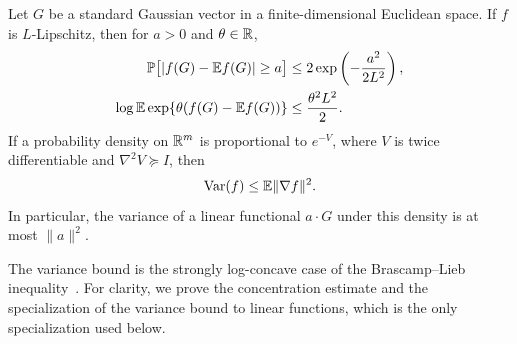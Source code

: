 \begin{lemma}\label{static-lem:gaussian-tools}
Let $G$ be a standard Gaussian vector in a finite-dimensional Euclidean space.
If $f$ is $L$-Lipschitz, then for $a>0$ and $\theta\in\mathbb R$,
\begin{align}
 \mathbb P\bigl[|f(G)-\mathbb E f(G)|\ge a\bigr]
 &\le 2\exp\left(-\frac{a^2}{2L^2}\right),
 \label{static-eq:gaussian-concentration}\\
 \log\mathbb E\exp\{\theta(f(G)-\mathbb E f(G))\}
 &\le\frac{\theta^2L^2}{2}.
 \label{static-eq:gaussian-mgf}
\end{align}
If a probability density on $\mathbb R^m$ is proportional to $e^{-V}$, where $V$ is
twice differentiable and $\nabla^2V\succeq I$, then
\begin{equation}\label{static-eq:brascamp-lieb}
 \operatorname{Var}(f)\le\mathbb E\|\nabla f\|^2.
\end{equation}
In particular, the variance of a linear functional $a\cdot G$ under this
density is at most $\|a\|^2$.
\end{lemma}

The variance bound is the strongly log-concave case of the
Brascamp--Lieb inequality~\cite{BL76}. For clarity, we prove the
concentration estimate and the specialization of the variance bound to
linear functions, which is the only specialization used below.

